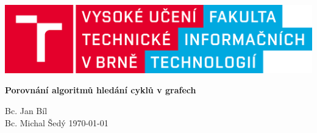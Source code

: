 \documentclass[]{fitthesis} %
\begin{document}

  \begin{titlepage}
    \begin{center}
      \includegraphics[width=0.77 \linewidth]{template-fig/fit-cz.png}


      \Huge{\textbf{Porovnání algoritmů hledání cyklů v grafech}}

    \end{center}


    \begin{minipage}[b]{0.96\textwidth}
      \Large Bc. Jan Bíl  \\
      Bc. Michal Šedý  \hfill \today
    \end{minipage}

  \end{titlepage}

  \setcounter{tocdepth}{2}\setcounter{page}{1}
  \setlength{\parskip}{0pt}

  {\hypersetup{hidelinks}\tableofcontents}

  \ifczech
    \renewcommand\listfigurename{Seznam obrázků}
  \fi
  \ifslovak
    \renewcommand\listfigurename{Zoznam obrázkov}
  \fi

  \ifczech
    \renewcommand\listtablename{Seznam tabulek}
  \fi
  \ifslovak
    \renewcommand\listtablename{Zoznam tabuliek}
  \fi

  \ifODSAZ
    \setlength{\parskip}{0.5\bigskipamount}
  \else
    \setlength{\parskip}{0pt}
  \fi

  \iftwoside
    \cleardoublepage
  \fi
\end{document}
